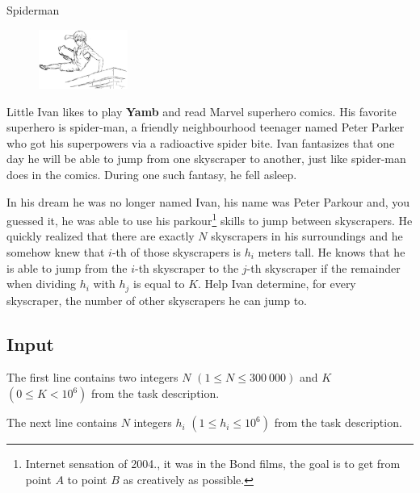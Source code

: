 \begin{statement}[
  problempoints=70,
  timelimit=1 second,
  memorylimit=512 MiB,
]{Spiderman}

\setlength\intextsep{-0.1cm}
\begin{figure}
\centering
\includegraphics[width=0.26\textwidth]{img/spiderman.png}
\end{figure}

Little Ivan likes to play \textbf{Yamb} and read Marvel superhero comics.
His favorite superhero is spider-man, a friendly neighbourhood teenager
named Peter Parker who got his superpowers via a radioactive spider bite.
Ivan fantasizes that one day he will be able to jump from one skyscraper to
another, just like spider-man does in the comics. During one such fantasy, he
fell asleep.

In his dream he was no longer named Ivan, his name was Peter Parkour and, you
guessed it, he was able to use his parkour\footnote{Internet sensation of
2004., it was in the Bond films, the goal is to get from point $A$ to point
$B$ as creatively as possible.} skills to jump between skyscrapers. He
quickly realized that there are exactly $N$ skyscrapers in his surroundings
and he somehow knew that $i$-th of those skyscrapers is $h_i$ meters tall. He
knows that he is able to jump from the $i$-th skyscraper to the $j$-th
skyscraper if the remainder when dividing $h_i$ with $h_j$ is equal to $K$.
Help Ivan determine, for every skyscraper, the number of other skyscrapers he
can jump to.

\subsection*{Input}
The first line contains two integers $N$ $(1 \le N \le 300\ 000)$ and $K$
$(0 \le K < 10^6)$ from the task description.

The next line contains $N$ integers $h_i$ $(1 \le h_i \le 10^6)$ from the task
description.


\end{statement}
